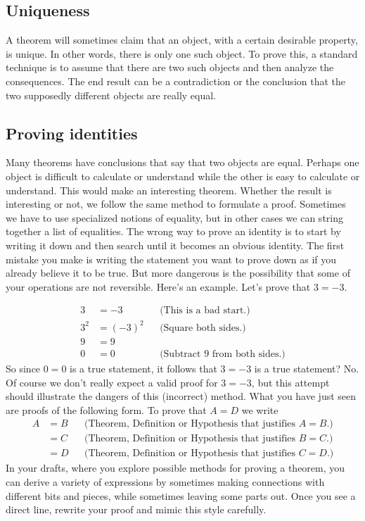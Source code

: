 \subsection{Uniqueness}
A theorem will sometimes claim that an object, with a certain desirable property, is unique. In other words, there is only one such object. To prove this, a standard technique is to assume that there are two such objects and then analyze the consequences. The end result can be a contradiction or the conclusion that the two supposedly different objects are really equal.

\subsection{Proving identities}
Many theorems have conclusions that say that two objects are equal. Perhaps one object is difficult to calculate or understand while the other is easy to calculate or understand. This would make an interesting theorem. Whether the result is interesting or not, we follow the same method to formulate a proof. Sometimes we have to use specialized notions of equality, but in other cases we can string together a list of equalities.
%
The wrong way to prove an identity is to start by writing it down and then search until it becomes an obvious identity. The first mistake you make is writing the statement you want to prove down as if you already believe it to be true. But more dangerous is the possibility that some of your operations are not reversible. Here's an example. Let's prove that $3=-3$.

\begin{align*}
3&=-3&&\text{(This is a bad start.)}\\
3^2&=(-3)^2&&\text{(Square both sides.)}\\
9&=9\\
0&=0&&\text{(Subtract 9 from both sides.)}
\end{align*}
%
So since $0=0$ is a true statement, it follows that $3=-3$ is a true statement? No. Of course we don't really expect a valid proof for $3=-3$, but this attempt should illustrate the dangers of this (incorrect) method.
%
What you have just seen are proofs of the following form. To prove that $A=D$ we write
%
\begin{align*}
A
&=B&&\text{(Theorem, Definition or Hypothesis that justifies $A=B$.)}\\
&=C&&\text{(Theorem, Definition or Hypothesis that justifies $B=C$.)}\\
&=D&&\text{(Theorem, Definition or Hypothesis that justifies $C=D$.)}
\end{align*}
%
In your drafts, where you explore possible methods for proving a theorem, you can derive a variety of expressions by sometimes making connections with different bits and pieces, while sometimes leaving some parts out. Once you see a direct line, rewrite your proof and mimic this style carefully.

